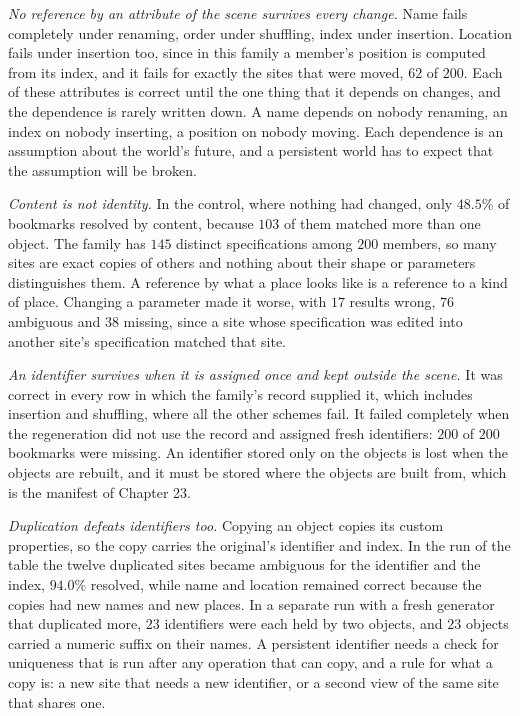 \emph{No reference by an attribute of the scene survives every change.} Name fails completely under renaming, order under shuffling, index under insertion. Location fails under insertion too, since in this family a member's position is computed from its index, and it fails for exactly the sites that were moved, $62$ of $200$. Each of these attributes is correct until the one thing that it depends on changes, and the dependence is rarely written down. A name depends on nobody renaming, an index on nobody inserting, a position on nobody moving. Each dependence is an assumption about the world's future, and a persistent world has to expect that the assumption will be broken.

\emph{Content is not identity.} In the control, where nothing had changed, only $48.5\%$ of bookmarks resolved by content, because $103$ of them matched more than one object. The family has $145$ distinct specifications among $200$ members, so many sites are exact copies of others and nothing about their shape or parameters distinguishes them. A reference by what a place looks like is a reference to a kind of place. Changing a parameter made it worse, with $17$ results wrong, $76$ ambiguous and $38$ missing, since a site whose specification was edited into another site's specification matched that site.

\emph{An identifier survives when it is assigned once and kept outside the scene.} It was correct in every row in which the family's record supplied it, which includes insertion and shuffling, where all the other schemes fail. It failed completely when the regeneration did not use the record and assigned fresh identifiers: $200$ of $200$ bookmarks were missing. An identifier stored only on the objects is lost when the objects are rebuilt, and it must be stored where the objects are built from, which is the manifest of Chapter 23.

\emph{Duplication defeats identifiers too.} Copying an object copies its custom properties, so the copy carries the original's identifier and index. In the run of the table the twelve duplicated sites became ambiguous for the identifier and the index, $94.0\%$ resolved, while name and location remained correct because the copies had new names and new places. In a separate run with a fresh generator that duplicated more, $23$ identifiers were each held by two objects, and $23$ objects carried a numeric suffix on their names. A persistent identifier needs a check for uniqueness that is run after any operation that can copy, and a rule for what a copy is: a new site that needs a new identifier, or a second view of the same site that shares one.

